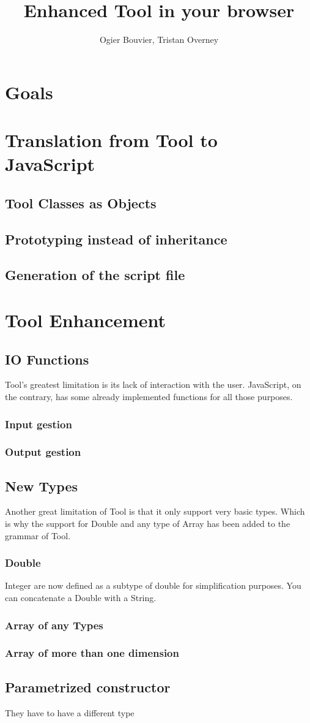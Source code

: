 \documentclass[11pt]{article}
\begin{document}
\title{Enhanced Tool in your browser}
\author{Ogier Bouvier, Tristan Overney}
\maketitle
\section{Goals}

\section{Translation from Tool to JavaScript}
\subsection{Tool Classes as Objects}
\subsection{Prototyping instead of inheritance}
\subsection{Generation of the script file}

\section{Tool Enhancement}
\subsection{IO Functions}
Tool's greatest limitation is its lack of interaction with the user. JavaScript, on the  contrary, has some already implemented functions for all those purposes.
\subsubsection{Input gestion}
\subsubsection{Output gestion}

\subsection{New Types}
Another great limitation of Tool is that it only support very basic types. Which is why the support for Double and any type of Array has been added to the grammar of Tool.
\subsubsection{Double}
Integer are now defined as a subtype of double for simplification purposes.
You can concatenate a Double with a String.
\subsubsection{Array of any Types}
\subsubsection{Array of more than one dimension}
\subsection{Parametrized constructor}
They have to have a different type
\end{document}
